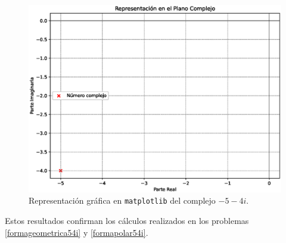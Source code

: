 \begin{prob}
\begin{myproof}
\begin{figure}[H]
\centering
\includegraphics[scale=0.35]{representacioncomplejo.eps}
\caption{Representación gráfica en \texttt{matplotlib} del complejo $-5-4i.$}
\end{figure}

Estos resultados confirman los cálculos realizados en los problemas \ref{formageometrica54i} y \ref{formapolar54i}.
\end{myproof}
\end{prob}

